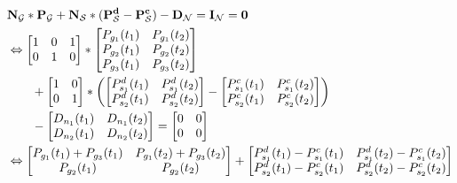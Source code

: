 \begin{subequations}
	\begin{align}
		& \vb{N_\mathcal{G}}*\vb{P_\mathcal{G}} + \vb{N_\mathcal{S}}*(\vb{P_\mathcal{S}^d} - \vb{P_\mathcal{S}^c}) - \vb{D_\mathcal{N}} = \vb{I_\mathcal{N}} = \vb{0} \\
		& \Leftrightarrow \begin{bmatrix}
			1 & 0 & 1 \\
			0 & 1 & 0 \\
		\end{bmatrix} * \begin{bmatrix}
				P_{g_1}(t_1) & P_{g_1}(t_2) \\
				P_{g_2}(t_1) & P_{g_2}(t_2) \\
				P_{g_3}(t_1) & P_{g_3}(t_2)
		\end{bmatrix} \\
		& \qquad + \begin{bmatrix}
			1 & 0 \\
			0 & 1 \\
		\end{bmatrix} * \left(\begin{bmatrix}
			P_{s_1}^d(t_1) & P_{s_1}^d(t_2) \\
			P_{s_2}^d(t_1) & P_{s_2}^d(t_2)
		\end{bmatrix} - \begin{bmatrix}
			P_{s_1}^c(t_1) & P_{s_1}^c(t_2) \\
			P_{s_2}^c(t_1) & P_{s_2}^c(t_2)
		\end{bmatrix} \right) \nonumber \\
		& \qquad - \begin{bmatrix}
			D_{n_1}(t_1) & D_{n_1}(t_2) \\
			D_{n_2}(t_1) & D_{n_2}(t_2)
		\end{bmatrix} = \begin{bmatrix}
			0 & 0 \\
			0 & 0
		\end{bmatrix} \nonumber \\
		& \Leftrightarrow \begin{bmatrix}
				P_{g_1}(t_1) + P_{g_3}(t_1) & P_{g_1}(t_2) + P_{g_3}(t_2) \\
				P_{g_2}(t_1) & P_{g_2}(t_2)
		\end{bmatrix} + \begin{bmatrix}
			P_{s_1}^d(t_1) - P_{s_1}^c(t_1) & P_{s_1}^d(t_2) - P_{s_1}^c(t_2) \\
			P_{s_2}^d(t_1) - P_{s_2}^c(t_1) & P_{s_2}^d(t_2) - P_{s_2}^c(t_2)

\end{bmatrix}
\end{align}
\end{subequations}
